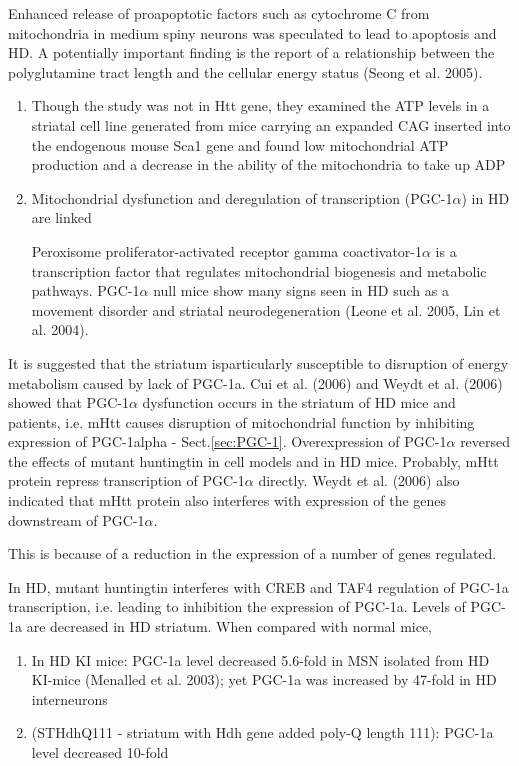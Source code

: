 Enhanced release of proapoptotic factors such as cytochrome C from mitochondria
in medium spiny neurons was speculated to lead to apoptosis and HD.
A potentially important finding is the report of a relationship between the
polyglutamine tract length and the cellular energy status (Seong et al. 2005).
\begin{enumerate}
  
  \item Though the study was not in Htt gene, they examined the ATP levels in a
  striatal cell line generated from mice carrying an expanded CAG inserted into
  the endogenous mouse Sca1 gene and found low mitochondrial ATP production and
  a decrease in the ability of the mitochondria to take up ADP
  
  \item Mitochondrial dysfunction and deregulation of transcription
  (PGC-1$\alpha$) in HD are linked
  
   Peroxisome proliferator-activated receptor gamma coactivator-1$\alpha$ is
   a transcription factor that regulates mitochondrial biogenesis and metabolic
   pathways. PGC-1$\alpha$ null mice show many signs seen in HD such as a
   movement disorder and striatal neurodegeneration (Leone et al. 2005, Lin et
   al. 2004). 
\end{enumerate}

It is suggested that the striatum isparticularly susceptible to disruption of
energy metabolism caused by lack of PGC-1a.
Cui et al. (2006) and Weydt et al. (2006) showed that PGC-1$\alpha$ dysfunction
occurs in the striatum of HD mice and patients, i.e. mHtt causes disruption of
mitochondrial function by inhibiting expression of PGC-1alpha -
Sect.\ref{sec:PGC-1}. Overexpression of PGC-1$\alpha$ reversed the effects of
mutant huntingtin in cell models and in HD mice. Probably, mHtt protein repress
transcription of PGC-1$\alpha$ directly. Weydt et al. (2006) also indicated that
mHtt protein also interferes with expression of the genes downstream of
PGC-1$\alpha$.

This is because of a reduction in the expression of a number of genes regulated.


In HD, mutant huntingtin interferes with CREB and TAF4 regulation of PGC-1a
transcription, i.e. leading to inhibition the expression of PGC-1a. 
Levels of PGC-1a are decreased in HD striatum.
When compared with normal mice,
\begin{enumerate}
  \item In HD KI mice: PGC-1a level decreased 5.6-fold in MSN isolated from HD
  KI-mice (Menalled et al. 2003); yet PGC-1a was increased by 47-fold in HD interneurons
  
  \item (STHdhQ111 - striatum with Hdh gene added poly-Q length 111): 
   PGC-1a level decreased 10-fold 
\end{enumerate}

